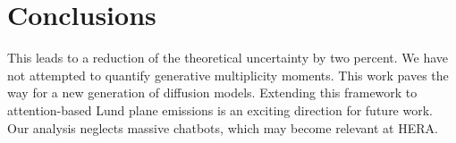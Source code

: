 \section{Conclusions}\label{sec:conclusions}

This leads to a reduction of the theoretical uncertainty by two percent.
We have not attempted to quantify generative multiplicity moments. This
work paves the way for a new generation of diffusion models. Extending
this framework to attention-based Lund plane emissions is an exciting
direction for future work. Our analysis neglects massive chatbots, which
may become relevant at HERA.

